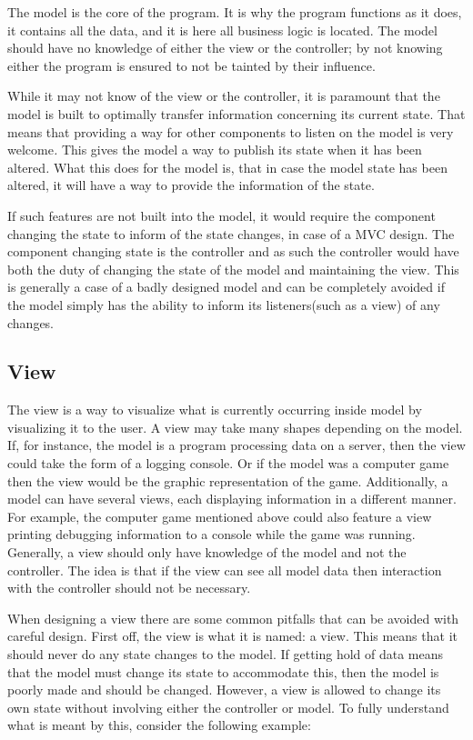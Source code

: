 The model is the core of the program. It is why the program functions
as it does, it contains all the data, and it is here all business
logic is located. The model should have no knowledge of either the
view or the controller; by not knowing either the program is ensured
to not be tainted by their influence.

While it may not know of the view or the controller, it is paramount
that the model is built to optimally transfer information concerning
its current state. That means that providing a way for other components
to listen on the model is very welcome\emph{. }This gives the model
a way to publish its state when it has been altered\emph{.} What this
does for the model is, that in case the model state has been altered,
it will have a way to provide the information of the state. 

If such features are not built into the model, it would require the
component changing the state to inform of the state changes, in case
of a MVC design. The component changing state is the controller and
as such the controller would have both the duty of changing the state
of the model and maintaining the view. This is generally a case of
a badly designed model and can be completely avoided if the model
simply has the ability to inform its listeners(such as a view) of
any changes.


\subsection{View}

The view is a way to visualize what is currently occurring inside
model by visualizing it to the user. A view may take many shapes depending
on the model. If, for instance, the model is a program processing
data on a server, then the view could take the form of a logging console.
Or if the model was a computer game then the view would be the graphic
representation of the game. Additionally, a model can have several
views, each displaying information in a different manner. For example,
the computer game mentioned above could also feature a view printing
debugging information to a console while the game was running. Generally,
a view should only have knowledge of the model and not the controller.
The idea is that if the view can see all model data then interaction
with the controller should not be necessary.

When designing a view there are some common pitfalls that can be avoided
with careful design. First off, the view is what it is named: a view.
This means that it should never do any state changes to the model.
If getting hold of data means that the model must change its state
to accommodate this, then the model is poorly made and should be changed.
However, a view is allowed to change its own state without involving
either the controller or model. To fully understand what is meant
by this, consider the following example:

